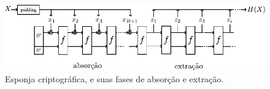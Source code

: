 \begin{figure}[htbp]
\begin{center}
    \includegraphics{figures/sponge.pdf}
    \caption{Esponja criptográfica, e suas fases de absorção e extração.}
    \label{fig:sponge}
\end{center}
\end{figure}







